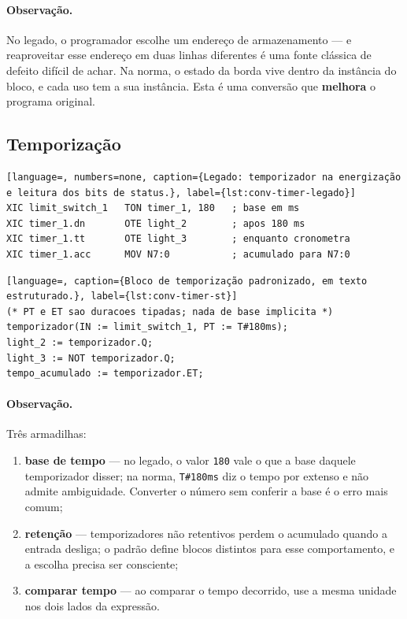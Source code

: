 \paragraph{Observação.} No legado, o programador escolhe um endereço de armazenamento --- e reaproveitar
esse endereço em duas linhas diferentes é uma fonte clássica de defeito difícil de achar. Na norma, o
estado da borda vive dentro da instância do bloco, e cada uso tem a sua instância. Esta é uma conversão
que \textbf{melhora} o programa original.

\subsection{Temporização}

\begin{lstlisting}[language=, numbers=none, caption={Legado: temporizador na energização e leitura dos bits de status.}, label={lst:conv-timer-legado}]
XIC limit_switch_1   TON timer_1, 180   ; base em ms
XIC timer_1.dn       OTE light_2        ; apos 180 ms
XIC timer_1.tt       OTE light_3        ; enquanto cronometra
XIC timer_1.acc      MOV N7:0           ; acumulado para N7:0
\end{lstlisting}

\begin{lstlisting}[language=, caption={Bloco de temporização padronizado, em texto estruturado.}, label={lst:conv-timer-st}]
(* PT e ET sao duracoes tipadas; nada de base implicita *)
temporizador(IN := limit_switch_1, PT := T#180ms);
light_2 := temporizador.Q;
light_3 := NOT temporizador.Q;
tempo_acumulado := temporizador.ET;
\end{lstlisting}

\paragraph{Observação.} Três armadilhas:

\begin{enumerate}
  \item \textbf{base de tempo} --- no legado, o valor \texttt{180} vale o que a base daquele
        temporizador disser; na norma, \texttt{T\#180ms} diz o tempo por extenso e não admite
        ambiguidade. Converter o número sem conferir a base é o erro mais comum;
  \item \textbf{retenção} --- temporizadores não retentivos perdem o acumulado quando a entrada
        desliga; o padrão define blocos distintos para esse comportamento, e a escolha precisa ser
        consciente;
  \item \textbf{comparar tempo} --- ao comparar o tempo decorrido, use a mesma unidade nos dois lados
        da expressão.
\end{enumerate}


